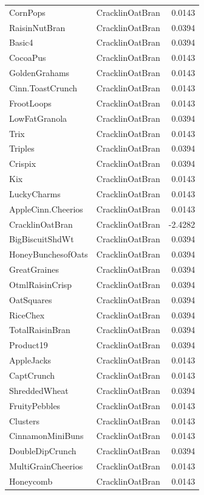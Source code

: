 \begin{longtable}{llr}
CornPops & CracklinOatBran & 0.0143 \\
RaisinNutBran & CracklinOatBran & 0.0394 \\
Basic4 & CracklinOatBran & 0.0394 \\
CocoaPus & CracklinOatBran & 0.0143 \\
GoldenGrahams & CracklinOatBran & 0.0143 \\
Cinn.ToastCrunch & CracklinOatBran & 0.0143 \\
FrootLoops & CracklinOatBran & 0.0143 \\
LowFatGranola & CracklinOatBran & 0.0394 \\
Trix & CracklinOatBran & 0.0143 \\
Triples & CracklinOatBran & 0.0394 \\
Crispix & CracklinOatBran & 0.0394 \\
Kix & CracklinOatBran & 0.0143 \\
LuckyCharms & CracklinOatBran & 0.0143 \\
AppleCinn.Cheerios & CracklinOatBran & 0.0143 \\
CracklinOatBran & CracklinOatBran & -2.4282 \\
BigBiscuitShdWt & CracklinOatBran & 0.0394 \\
HoneyBunchesofOats & CracklinOatBran & 0.0394 \\
GreatGraines & CracklinOatBran & 0.0394 \\
OtmlRaisinCrisp & CracklinOatBran & 0.0394 \\
OatSquares & CracklinOatBran & 0.0394 \\
RiceChex & CracklinOatBran & 0.0394 \\
TotalRaisinBran & CracklinOatBran & 0.0394 \\
Product19 & CracklinOatBran & 0.0394 \\
AppleJacks & CracklinOatBran & 0.0143 \\
CaptCrunch & CracklinOatBran & 0.0143 \\
ShreddedWheat & CracklinOatBran & 0.0394 \\
FruityPebbles & CracklinOatBran & 0.0143 \\
Clusters & CracklinOatBran & 0.0143 \\
CinnamonMiniBuns & CracklinOatBran & 0.0143 \\
DoubleDipCrunch & CracklinOatBran & 0.0394 \\
MultiGrainCheerios & CracklinOatBran & 0.0143 \\
Honeycomb & CracklinOatBran & 0.0143 \\

\end{longtable}
